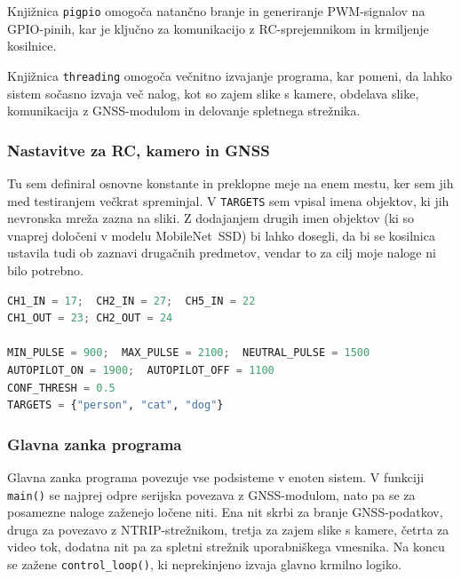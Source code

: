 \documentclass[12pt]{article}
\begin{document}
Knjižnica \texttt{pigpio} omogoča natančno branje in generiranje
PWM-signalov na GPIO-pinih, kar je ključno za komunikacijo z
RC-sprejemnikom in krmiljenje kosilnice.

Knjižnica \texttt{threading} omogoča večnitno izvajanje programa,
kar pomeni, da lahko sistem sočasno izvaja več nalog, kot so zajem
slike s kamere, obdelava slike, komunikacija z GNSS-modulom in
delovanje spletnega strežnika.

\subsubsection{Nastavitve za RC, kamero in GNSS}

Tu sem definiral osnovne konstante in preklopne meje na enem mestu,
ker sem jih med testiranjem večkrat spreminjal. V \texttt{TARGETS} sem
vpisal imena objektov, ki jih nevronska mreža zazna na sliki. Z dodajanjem drugih
imen objektov (ki so vnaprej določeni v modelu MobileNet~SSD) bi lahko dosegli, da bi se kosilnica ustavila tudi ob
zaznavi drugačnih predmetov, vendar to za cilj moje naloge ni bilo
potrebno.

\begin{lstlisting}[language=Python,
  caption={Ključne nastavitve za signalne pragove in zaznavo.}]
CH1_IN = 17;  CH2_IN = 27;  CH5_IN = 22
CH1_OUT = 23; CH2_OUT = 24

MIN_PULSE = 900;  MAX_PULSE = 2100;  NEUTRAL_PULSE = 1500
AUTOPILOT_ON = 1900;  AUTOPILOT_OFF = 1100
CONF_THRESH = 0.5
TARGETS = {"person", "cat", "dog"}
\end{lstlisting}

\subsubsection{Glavna zanka programa}

Glavna zanka programa povezuje vse podsisteme v enoten sistem. V
funkciji \texttt{main()} se najprej odpre serijska povezava z
GNSS-modulom, nato pa se za posamezne naloge zaženejo ločene niti.
Ena nit skrbi za branje GNSS-podatkov, druga za povezavo z
NTRIP-strežnikom, tretja za zajem slike s kamere, četrta za video
tok, dodatna nit pa za spletni strežnik uporabniškega vmesnika. Na
koncu se zažene \texttt{control\_loop()}, ki neprekinjeno izvaja
glavno krmilno logiko.
\end{document}
